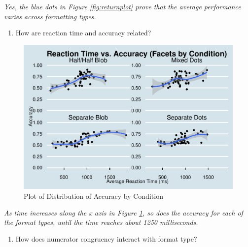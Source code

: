 \documentclass[
  man,floatsintext]{apa6}
\providecommand{\tightlist}{%
  \setlength{\itemsep}{0pt}\setlength{\parskip}{0pt}}
\begin{document}
\emph{Yes, the blue dots in Figure \ref{fig:returnplot} prove that the average performance varies across formatting types.}

\newpage

\begin{enumerate}
\def\labelenumi{\arabic{enumi}.}
\setcounter{enumi}{1}
\tightlist
\item
  How are reaction time and accuracy related?
\end{enumerate}

\begin{figure}[H]

{\centering \includegraphics[width=0.7\linewidth]{Chin_WA11_files/figure-latex/timevsacc-1} 

}

\caption{Plot of Distribution of Accuracy by Condition}\label{fig:timevsacc}
\end{figure}

\emph{As time increases along the x axis in Figure \ref{fig:timevsacc}, so does the accuracy for each of the format types, until the time reaches about 1250 milliseconds.}

\newpage

\begin{enumerate}
\def\labelenumi{\arabic{enumi}.}
\setcounter{enumi}{2}
\tightlist
\item
  How does numerator congruency interact with format type?
\end{enumerate}
\end{document}
